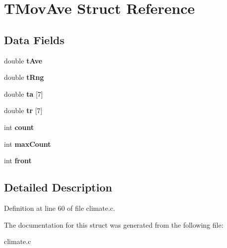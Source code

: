 \hypertarget{struct_t_mov_ave}{}\section{T\+Mov\+Ave Struct Reference}
\label{struct_t_mov_ave}
\subsection*{Data Fields}
\begin{DoxyCompactItemize}
\item 
\mbox{\label{struct_t_mov_ave_abdb95aee80a3277ccf4bf8ef74edaf96}} 
double {\bfseries t\+Ave}
\item 
\mbox{\label{struct_t_mov_ave_a85ce46c5a179b5849c971ea1a3fe36fa}} 
double {\bfseries t\+Rng}
\item 
\mbox{\label{struct_t_mov_ave_a8db36836e280dab118ac838070f9665d}} 
double {\bfseries ta} \mbox{[}7\mbox{]}
\item 
\mbox{\label{struct_t_mov_ave_a2f768100c7d328f33df81edc696c4dbd}} 
double {\bfseries tr} \mbox{[}7\mbox{]}
\item 
\mbox{\label{struct_t_mov_ave_ad43c3812e6d13e0518d9f8b8f463ffcf}} 
int {\bfseries count}
\item 
\mbox{\label{struct_t_mov_ave_a07debaa5993cfc8e6ecde1f620c7135a}} 
int {\bfseries max\+Count}
\item 
\mbox{\label{struct_t_mov_ave_ac261b45b6346e633de22d510c9f6a770}} 
int {\bfseries front}
\end{DoxyCompactItemize}


\subsection{Detailed Description}


Definition at line 60 of file climate.\+c.



The documentation for this struct was generated from the following file\+:\begin{DoxyCompactItemize}
\item 
climate.\+c\end{DoxyCompactItemize}
